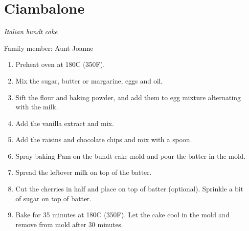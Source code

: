 \chapter{Ciambalone}
\label{ch:ciambalone}


\textit{Italian bundt cake}

Family member: Aunt Joanne

\begin{enumerate}
    \item Preheat oven at 180\degree C (350\degree F).
    \item Mix the sugar, butter or margarine, eggs and oil.
    \item Sift the flour and baking powder, and add them to egg mixture alternating with the milk.
    \item Add the vanilla extract and mix.
    \item Add the raisins and chocolate chips and mix with a spoon.
    \item Spray baking Pam on the bundt cake mold and pour the batter in the mold.
    \item Spread the leftover milk on top of the batter.
    \item Cut the cherries in half and place on top of batter (optional). Sprinkle a bit of sugar on top of batter.
    \item Bake for 35 minutes at 180\degree C (350\degree F). Let the cake cool in the mold and remove from mold after 30 minutes.
\end{enumerate}



